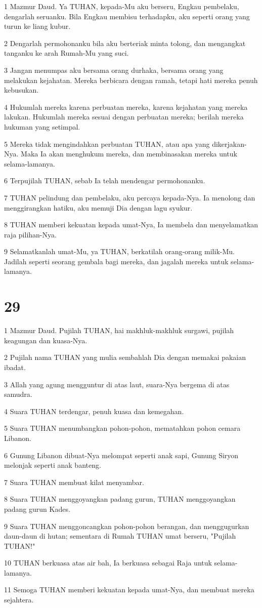 \par 1 Mazmur Daud. Ya TUHAN, kepada-Mu aku berseru, Engkau pembelaku, dengarlah seruanku. Bila Engkau membisu terhadapku, aku seperti orang yang turun ke liang kubur.
\par 2 Dengarlah permohonanku bila aku berteriak minta tolong, dan mengangkat tanganku ke arah Rumah-Mu yang suci.
\par 3 Jangan menumpas aku bersama orang durhaka, bersama orang yang melakukan kejahatan. Mereka berbicara dengan ramah, tetapi hati mereka penuh kebusukan.
\par 4 Hukumlah mereka karena perbuatan mereka, karena kejahatan yang mereka lakukan. Hukumlah mereka sesuai dengan perbuatan mereka; berilah mereka hukuman yang setimpal.
\par 5 Mereka tidak mengindahkan perbuatan TUHAN, atau apa yang dikerjakan-Nya. Maka Ia akan menghukum mereka, dan membinasakan mereka untuk selama-lamanya.
\par 6 Terpujilah TUHAN, sebab Ia telah mendengar permohonanku.
\par 7 TUHAN pelindung dan pembelaku, aku percaya kepada-Nya. Ia menolong dan menggirangkan hatiku, aku memuji Dia dengan lagu syukur.
\par 8 TUHAN memberi kekuatan kepada umat-Nya, Ia membela dan menyelamatkan raja pilihan-Nya.
\par 9 Selamatkanlah umat-Mu, ya TUHAN, berkatilah orang-orang milik-Mu. Jadilah seperti seorang gembala bagi mereka, dan jagalah mereka untuk selama-lamanya.

\chapter{29}

\par 1 Mazmur Daud. Pujilah TUHAN, hai makhluk-makhluk surgawi, pujilah keagungan dan kuasa-Nya.
\par 2 Pujilah nama TUHAN yang mulia sembahlah Dia dengan memakai pakaian ibadat.
\par 3 Allah yang agung mengguntur di atas laut, suara-Nya bergema di atas samudra.
\par 4 Suara TUHAN terdengar, penuh kuasa dan kemegahan.
\par 5 Suara TUHAN menumbangkan pohon-pohon, mematahkan pohon cemara Libanon.
\par 6 Gunung Libanon dibuat-Nya melompat seperti anak sapi, Gunung Siryon melonjak seperti anak banteng.
\par 7 Suara TUHAN membuat kilat menyambar.
\par 8 Suara TUHAN menggoyangkan padang gurun, TUHAN menggoyangkan padang gurun Kades.
\par 9 Suara TUHAN menggoncangkan pohon-pohon berangan, dan menggugurkan daun-daun di hutan; sementara di Rumah TUHAN umat berseru, "Pujilah TUHAN!"
\par 10 TUHAN berkuasa atas air bah, Ia berkuasa sebagai Raja untuk selama-lamanya.
\par 11 Semoga TUHAN memberi kekuatan kepada umat-Nya, dan membuat mereka sejahtera.

